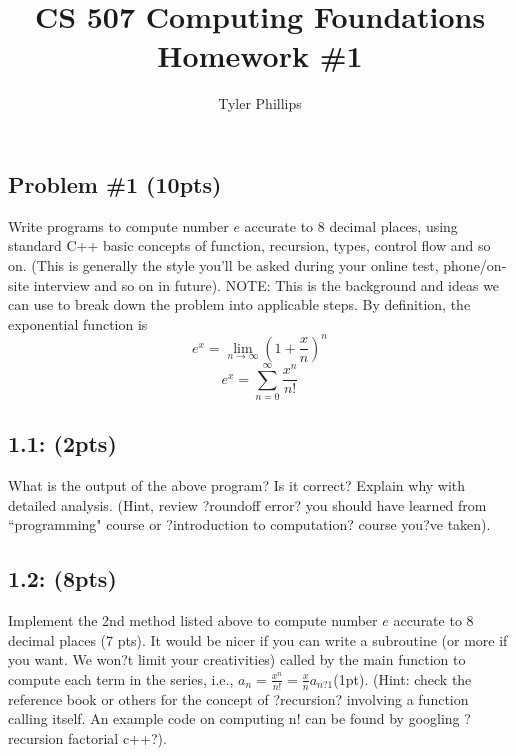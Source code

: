 \documentclass{article}
\title{CS 507 Computing Foundations \\ Homework \#1 \\}
\author{Tyler Phillips}
\begin{document}
\maketitle

\begin{framed} \vspace{-.2in}
\section*{Problem \#1 (10pts)}
Write programs to compute number $e$ accurate to 8 decimal places, using standard C++ basic concepts of function, recursion, types, control flow and so on. (This is generally the style you'll be asked during your online test, phone/on-site interview and so on in future).
NOTE: This is the background and ideas we can use to break down the problem into applicable steps.
By definition, the exponential function is
$$e^x = \lim_{n \to \infty} \left( 1 + \frac{x}{n} \right)^n $$
$$e^x = \sum_{n=0}^{\infty} \frac{x^n}{n!}$$

\subsection*{1.1: (2pts)}
What is the output of the above program? Is it correct? Explain why with detailed analysis. (Hint, review ?roundoff error? you should have learned from ``programming" course or ?introduction to computation? course you?ve taken).

\subsection*{1.2: (8pts)}
Implement the 2nd method listed above to compute number $e$ accurate to 8 decimal places (7 pts). It would be nicer if you can write a subroutine (or more if you want. We won?t limit your
creativities) called by the main function to compute each term in the series, i.e., $a_n = \frac{x^n}{n!} = \frac{x}{n} a_{n?1} $(1pt). (Hint: check the reference book or others for the concept of ?recursion? involving a function calling itself. An example code on computing n! can be found by googling ?recursion factorial c++?).

\end{framed}
\end{document}
